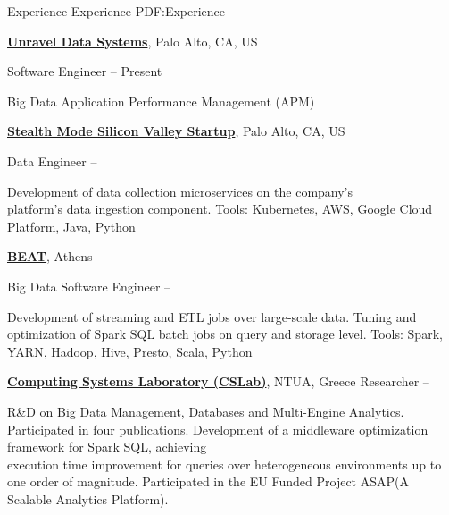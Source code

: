 
\Section
{Experience}
{Experience}
{PDF:Experience}

\Entry
\href{http://unraveldata.com}
{\textbf{Unravel Data Systems}}, Palo Alto, CA, US

\Gap
\BulletItem
Software Engineer
\hfill
{} --
Present
\begin{Detail}
	\SubBulletItem
	Big Data Application Performance Management (APM)
\end{Detail}

\Entry
\href{}
{\textbf{Stealth Mode Silicon Valley Startup}}, Palo Alto, CA, US

\Gap
\BulletItem
Data Engineer
\hfill
{} --
\begin{Detail}
	\SubBulletItem
	Development of data collection microservices on the company’s\\
	platform’s data ingestion component.
	\SubBulletItem
	Tools: Kubernetes, AWS, Google Cloud Platform, Java, Python
\end{Detail}

\Entry
\href{http://taxibeat.gr}
{\textbf{BEAT}}, Athens

\Gap
\BulletItem
Big Data Software Engineer
\hfill
{} --
\begin{Detail}
	\SubBulletItem
	Development of streaming and ETL jobs over large-scale data.
	\SubBulletItem
	Tuning and optimization of Spark SQL batch jobs on query and storage level.
	\SubBulletItem
	Tools: Spark, YARN, Hadoop, Hive, Presto, Scala, Python
\end{Detail}

\Entry
\href{http://cslab.ece.ntua.gr}
{\textbf{Computing Systems Laboratory (CSLab)}},
NTUA, Greece
\Gap
\BulletItem
Researcher
\hfill
{} --
\begin{Detail}
	\SubBulletItem
	R\&D on Big Data Management, Databases and Multi-Engine Analytics.
	\SubBulletItem
	Participated in four publications.
	\SubBulletItem
	Development of a middleware optimization framework for Spark SQL, achieving\\execution
	time improvement for queries over heterogeneous environments up to one order of magnitude.
	\SubBulletItem
	Participated in the EU Funded Project ASAP(A Scalable Analytics Platform).
\end{Detail}

